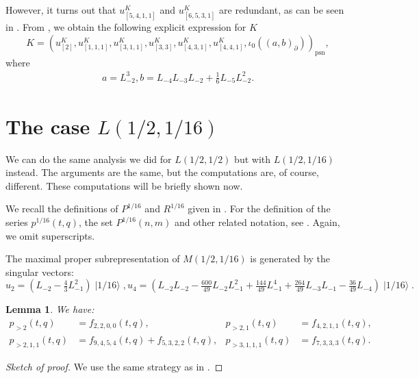 \documentclass[a4paper, 12pt, reqno]{amsart}
\newtheorem{lemma}[theorem]{Lemma}
\theoremstyle{remark}
\DeclareMathOperator{\psn}{psn}
\DeclareMathOperator{\vacsixteen}{|1/16\rangle}
\begin{document}
However, it turns out that $u^K_{[5, 4, 1, 1]}$ and $u^K_{[6, 5, 3, 1]}$ are redundant, as can be seen in \cite[m11-m15.ipynb]{sagemath2}.
From \cite[Theorem 2]{andrews_singular_2022}, we obtain the following explicit expression for $K$
\begin{equation*}
  K = (u^K_{[2]}, u^K_{[1, 1, 1]}, u^K_{[3, 1, 1]}, u^K_{[3, 3]}, u^K_{[4, 3, 1]}, u^K_{[4, 4, 1]}, \iota_0((a, b)_{\partial}))_{\psn},
\end{equation*}
where
\begin{align*}
  a = L_{-2}^3, b = L_{-4}L_{-3}L_{-2} + \tfrac{1}{6}L_{-5}L_{-2}^2.
\end{align*}

\section{The case $L(1/2, 1/16)$}
\label{sec:case-l12-116}

We can do the same analysis we did for $L(1/2, 1/2)$ but with $L(1/2, 1/16)$ instead.
The arguments are the same, but the computations are, of course, different.
These computations will be briefly shown now.

We recall the definitions of $P^{1/16}$ and $R^{1/16}$ given in .
For the definition of the series $p^{1/16}(t, q)$, the set $P^{1/16}(n, m)$ and other related notation, see .
Again, we omit superscripts.

The maximal proper subrepresentation of $M(1/2, 1/16)$ is generated by the singular vectors:
\begin{equation*}
  u_2 = (L_{-2} - \tfrac{4}{3}L_{-1}^2)\vacsixteen, u_4 = (L_{-2}L_{-2} - \tfrac{600}{49}L_{-2}L_{-1}^2 + \tfrac{144}{49}L_{-1}^4 + \tfrac{264}{49}L_{-3}L_{-1} - \tfrac{36}{49}L_{-4})\vacsixteen.
\end{equation*}

\begin{lemma}
  \label{lmm:12}
  We have:
  \begin{align*}
    p_{>2}(t, q) &= f_{2, 2, 0, 0}(t, q), &p_{>2, 1}(t, q) &= f_{4, 2, 1, 1}(t, q), \\
    p_{>2, 1, 1}(t, q) &= f_{9, 4, 5, 4}(t, q) + f_{5, 3, 2, 2}(t, q), &p_{>3, 1, 1, 1}(t, q) &= f_{7, 3, 3, 3}(t, q).
  \end{align*}
\end{lemma}

\begin{proof}[Sketch of proof]
  We use the same strategy as in .
\end{proof}
\end{document}
